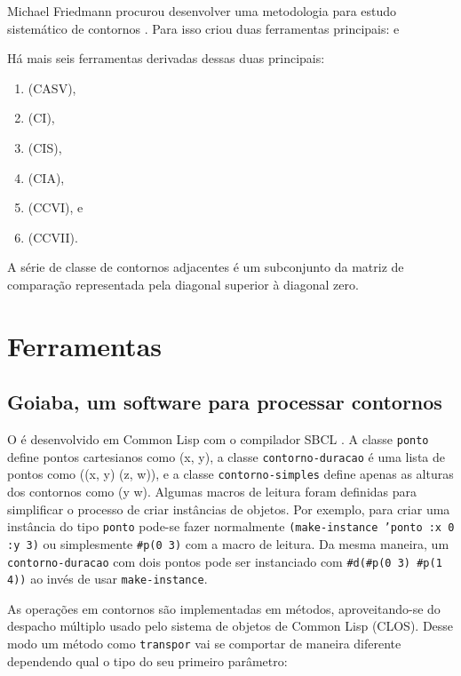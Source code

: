 Michael Friedmann procurou desenvolver uma metodologia para estudo
sistemático de contornos \cite{friedmann85:methodology}. Para isso
criou duas ferramentas principais:  e 

Há mais seis ferramentas derivadas dessas duas principais:

\begin{enumerate}
\item {} (CASV),
\item {} (CI),
\item {} (CIS),
\item {} (CIA),
\item {} (CCVI), e
\item {} (CCVII).
\end{enumerate}

A série de classe de contornos adjacentes é um subconjunto da matriz
de comparação representada pela diagonal superior à diagonal zero.

\chapter{Ferramentas}
\label{cha:ferramentas}


\section{Goiaba, um software para processar contornos}
\label{sec:goiaba-software-para}

O \goiaba{} é desenvolvido em Common Lisp com o compilador SBCL
\cite{team07:sbcl}.
A classe \texttt{ponto} define pontos cartesianos como (x, y), a
classe \texttt{contorno-duracao} é uma lista de pontos como ((x, y)
(z, w)), e a classe \texttt{contorno-simples} define apenas as alturas
dos contornos como (y w). Algumas macros de leitura foram definidas
para simplificar o processo de criar instâncias de objetos. Por
exemplo, para criar uma instância do tipo \texttt{ponto} pode-se fazer
normalmente \texttt{(make-instance 'ponto :x 0 :y 3)} ou simplesmente
\verb!#p(0 3)! com a macro de leitura. Da mesma maneira, um
\texttt{contorno-duracao} com dois pontos pode ser instanciado com
\verb!#d(#p(0 3) #p(1 4))! ao invés de usar \texttt{make-instance}.

As operações em contornos são implementadas em métodos,
aproveitando-se do despacho múltiplo usado pelo sistema de objetos de
Common Lisp (CLOS). Desse modo um método como \texttt{transpor} vai se
comportar de maneira diferente dependendo qual o tipo do seu primeiro
parâmetro:


